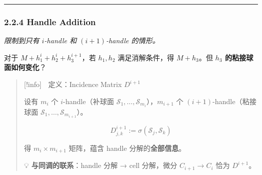 \documentclass[
  letterpaper,
  DIV=11,
  numbers=noendperiod]{scrartcl}
\begin{document}
\begin{center}\rule{0.5\linewidth}{0.5pt}\end{center}

\subsubsection{2.2.4 Handle Addition}\label{handle-addition}

\emph{限制到只有 \(i\)-handle 和 \((i+1)\)-handle 的情形。}

对于 \(M + h_1^i + h_2^i + h_3^{i+1}\)，若 \(h_1, h_2\) 满足消解条件，得
\(M + h_3\)。但 \textbf{\(h_3\) 的粘接球面如何变化}？

\begin{quote}
{[}!info{]} 📐 定义：Incidence Matrix \(D^{i+1}\)

设有 \(m_i\) 个 \(i\)-handle（补球面
\(\mathcal{S}_1, \ldots, \mathcal{S}_{m_i}\)），\(m_{i+1}\) 个
\((i+1)\)-handle（粘接球面
\(\mathscr{S}_1, \ldots, \mathscr{S}_{m_{i+1}}\)）。

\[\boxed{D^{i+1}_{j,k} := \sigma(\mathcal{S}_j, \mathscr{S}_k)}\]

得 \(m_i \times m_{i+1}\) 矩阵，蕴含 handle 分解的\textbf{全部信息}。

💡 \textbf{与同调的联系}：handle 分解 → cell 分解，微分
\(C_{i+1} \to C_i\) 恰为 \(D^{i+1}\)。
\end{quote}
\end{document}
